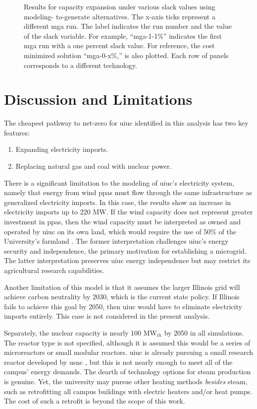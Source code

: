 \begin{figure}[H]
  \centering
  \resizebox{0.95\columnwidth}{!}{}
  \caption{Results for capacity expansion under various slack values using modeling-
  to-generate alternatives. The x-axis ticks represent a different \gls{mga} run.
  The label indicates the run number and the value of the slack variable. For example,
  ``mga-1-1\%'' indicates the first \gls{mga} run with a one percent
  slack value. For reference, the cost minimized solution ``mga-0-x\%,'' is also
  plotted. Each row of panels corresponds to a different technology.}
  \label{fig:uiuc_chw_mga}
\end{figure}

\section{Discussion and Limitations}
The cheapest pathway to net-zero for \gls{uiuc} identified in this analysis has two key features:
\begin{enumerate}
\item Expanding electricity imports.
\item Replacing natural gas and coal with nuclear power.
\end{enumerate}
There is a significant limitation to the modeling of \gls{uiuc}'s electricity system, namely that energy from wind \glspl{ppa} must flow
through the same infrastructure as generalized electricity imports. In this case, the results show an increase in electricity imports up to 220 MW. If the wind capacity does not represent greater investment in \glspl{ppa}, then the wind capacity must be interpreted as owned and operated by \gls{uiuc} on its own land, which would require the use of 50\% of the University's farmland \cite{lopez_us_2012}. The former interpretation challenges \gls{uiuc}'s energy security and independence, the primary motivation for establishing a microgrid. The latter interpretation preserves \gls{uiuc} energy independence but may restrict its agricultural research capabilities.

Another limitation of this model is that it assumes the larger Illinois grid will achieve carbon neutrality by 2030, which is the current state policy. If Illinois fails to achieve this goal by 2050, then \gls{uiuc} would have to eliminate electricity imports entirely. This case is not considered in the present analysis.

Separately, the nuclear capacity is nearly 100 MW$_{th}$ by 2050 in all simulations. The reactor type is not specified, although it is assumed this would be a series of microreactors or small modular reactors. \gls{uiuc} is already pursuing a small research reactor developed by \gls{usnc} \cite{noauthor_university_2021}, but this is not nearly enough to meet all of the campus' energy demands. The dearth of technology options for steam production is genuine. Yet, the university may pursue other heating methods \textit{besides} steam, such as retrofitting all campus buildings with electric heaters and/or heat pumps. The cost of such a retrofit is beyond the scope of this work. 

